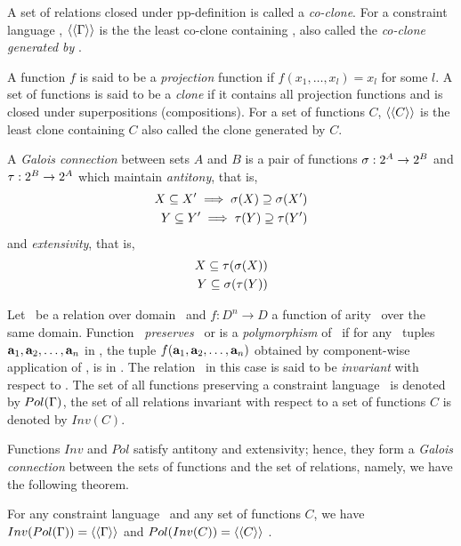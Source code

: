 A set of relations closed under pp-definition is called a \emph{co-clone}.
For a constraint language \mrelset, \(\langle\langle \Gamma \rangle\rangle\) is the the least co-clone containing
\mrelset, also called the \emph{co-clone generated by \mrelset}\@.

A function \(f\) is said to be a \emph{projection} function if \(f(x_1,\dotsc,x_l)=x_l\) 
for some \(l\)\@.
A set of functions is said to be a \emph{clone} if it contains all projection
functions and is closed under superpositions (compositions). For a set of functions
\(C\), \(\langle\langle C \rangle\rangle\) is the least clone containing \(C\) also called the clone generated by \(C\)\@.

A \emph{Galois connection} between sets \(A\) and \(B\) is a pair of functions
\(\sigma:2^{A} \to 2^{B}\) and \(\tau:2^{B} \to 2^{A}\) 
which maintain {\em antitony}, that is,
\begin{align*}
X \subseteq X' \implies \sigma(X) \supseteq \sigma(X') \\
Y \subseteq Y' \implies \tau(Y) \supseteq \tau(Y') \\
\end{align*}
and {\em extensivity}, that is,
\begin{align*}
X \subseteq \tau(\sigma(X)) \\
Y \subseteq \sigma(\tau(Y))
\end{align*}

Let \mR\ be a relation over domain \mD\ and \(f:D^n\to D\) a function of arity \mn\ over the
same domain. Function \mf\ \emph{preserves} \mR\ or is a \emph{polymorphism} of \mR\ if
for any \mn\ tuples \(\textbf{a}_1,\textbf{a}_2,\dotsc,\textbf{a}_n\) in \mR, the tuple
\(f(\textbf{a}_1,\textbf{a}_2,\dotsc,\textbf{a}_n)\) obtained by component-wise application of \mf,
is in \mR\@. The relation \mR\ in this case is said to be \emph{invariant} with respect 
to \mf\@.
The set of all functions preserving a constraint language \mrelset\ is 
denoted by \(Pol(\Gamma)\), the set of all relations invariant with respect to a set of
functions  \(C\) is denoted by \(Inv(C)\)\@.

Functions \(Inv\) and \(Pol\) satisfy antitony and extensivity; hence, they 
form a \emph{Galois connection} between the sets of functions 
and the set of relations, namely, we have the following theorem.

\begin{theorem}
For any constraint language \mrelset\ and 
any set of functions \(C\), 
we have \(Inv(Pol(\Gamma))=\langle\langle \Gamma \rangle\rangle\)
and
\(Pol(Inv(C))=\langle\langle C \rangle\rangle\)
\@.
\end{theorem}

